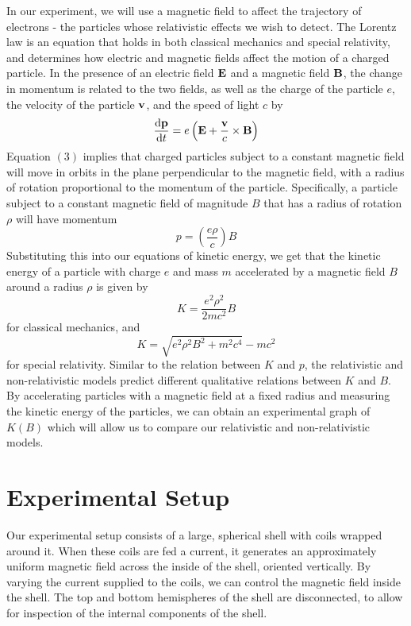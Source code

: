 In our experiment, we will use a magnetic field to affect the trajectory of electrons - the particles whose relativistic effects we wish to detect. The Lorentz law is an equation that holds in both classical mechanics and special relativity, and determines how electric and magnetic fields affect the motion of a charged particle. In the presence of an electric field $\vb{E}$ and a magnetic field $\vb{B}$, the change in momentum is related to the two fields, as well as the charge of the particle $e$, the velocity of the particle $\vb{v}$, and the speed of light $c$ by
\begin{equation}
    \dv{\vb{p}}{t} = e\left(\vb{E} + \frac{\vb{v}}{c} \times \vb{B} \right)
  \end{equation}
  Equation $(3)$ implies that charged particles subject to a constant magnetic field will move in orbits in the plane perpendicular to the magnetic field, with a radius of rotation proportional to the momentum of the particle. Specifically, a particle subject to a constant magnetic field of magnitude $B$ that has a radius of rotation $\rho$ will have momentum 
  \begin{equation}
    p = \left(\frac{e\rho}{c}\right) B
  \end{equation}
Substituting this into our equations of kinetic energy, we get that the kinetic energy of a particle with charge $e$ and mass $m$ accelerated by a magnetic field $B$ around a radius $\rho$ is given by
\begin{equation}
  K = \frac{e^2 \rho^2}{2mc^2} B
\end{equation}
for classical mechanics, and
\begin{equation}
  K = \sqrt{e^2 \rho^2 B^2 + m^2 c^4} - mc^2
\end{equation}
for special relativity. Similar to the relation between $K$ and $p$, the relativistic and non-relativistic models predict different qualitative relations between $K$ and $B$. By accelerating particles with a magnetic field at a fixed radius and measuring the kinetic energy of the particles, we can obtain an experimental graph of $K(B)$ which will allow us to compare our relativistic and non-relativistic models.
\section{Experimental Setup}
Our experimental setup consists of a large, spherical shell with coils wrapped around it. When these coils are fed a current, it generates an approximately uniform magnetic field across the inside of the shell, oriented vertically. By varying the current supplied to the coils, we can control the magnetic field inside the shell. The top and bottom hemispheres of the shell are disconnected, to allow for inspection of the internal components of the shell.

